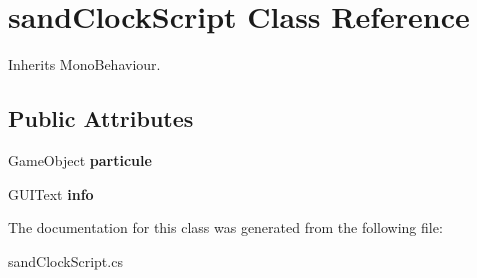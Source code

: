 \hypertarget{classsand_clock_script}{\section{sand\+Clock\+Script Class Reference}
\label{classsand_clock_script}
}


Inherits Mono\+Behaviour.

\subsection*{Public Attributes}
\begin{DoxyCompactItemize}
\item 
\hypertarget{classsand_clock_script_a0a2768ef9b901ec45e2b9a2f08f5c9f9}{Game\+Object {\bfseries particule}}\label{classsand_clock_script_a0a2768ef9b901ec45e2b9a2f08f5c9f9}

\item 
\hypertarget{classsand_clock_script_add0ee26f7b9f6e17fe4531716c06475a}{G\+U\+I\+Text {\bfseries info}}\label{classsand_clock_script_add0ee26f7b9f6e17fe4531716c06475a}

\end{DoxyCompactItemize}


The documentation for this class was generated from the following file\+:\begin{DoxyCompactItemize}
\item 
sand\+Clock\+Script.\+cs\end{DoxyCompactItemize}
